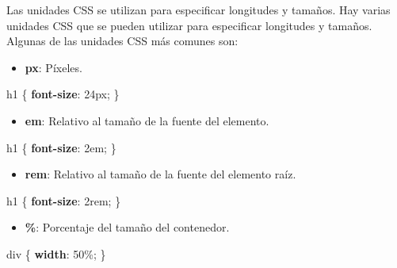 \documentclass[
  a4paper,
  DIV=11,
  numbers=noendperiod,
  onepage,
  openany]{scrreprt}
\newenvironment{Shaded}{\begin{snugshade}}{\end{snugshade}}
\newcommand{\CharTok}[1]{\textcolor[rgb]{0.13,0.47,0.30}{#1}}
\newcommand{\DataTypeTok}[1]{\textcolor[rgb]{0.68,0.00,0.00}{#1}}
\newcommand{\DecValTok}[1]{\textcolor[rgb]{0.68,0.00,0.00}{#1}}
\newcommand{\KeywordTok}[1]{\textcolor[rgb]{0.00,0.23,0.31}{\textbf{#1}}}
\newcommand{\NormalTok}[1]{\textcolor[rgb]{0.00,0.23,0.31}{#1}}
\newcommand{\OperatorTok}[1]{\textcolor[rgb]{0.37,0.37,0.37}{#1}}
\providecommand{\tightlist}{%
  \setlength{\itemsep}{0pt}\setlength{\parskip}{0pt}}\usepackage{longtable,booktabs,array}
\begin{document}
\begin{tcolorbox}
Las unidades CSS se utilizan para especificar longitudes y tamaños. Hay
varias unidades CSS que se pueden utilizar para especificar longitudes y
tamaños. Algunas de las unidades CSS más comunes son:

\begin{itemize}
\tightlist
\item
  \textbf{px}: Píxeles.
\end{itemize}

\begin{Shaded}
\begin{Highlighting}[]
\NormalTok{h1 \{}
  \KeywordTok{font{-}size}\CharTok{:} \DecValTok{24}\DataTypeTok{px}\OperatorTok{;}
\NormalTok{\}}
\end{Highlighting}
\end{Shaded}

\begin{itemize}
\tightlist
\item
  \textbf{em}: Relativo al tamaño de la fuente del elemento.
\end{itemize}

\begin{Shaded}
\begin{Highlighting}[]
\NormalTok{h1 \{}
  \KeywordTok{font{-}size}\CharTok{:} \DecValTok{2}\DataTypeTok{em}\OperatorTok{;}
\NormalTok{\}}
\end{Highlighting}
\end{Shaded}

\begin{itemize}
\tightlist
\item
  \textbf{rem}: Relativo al tamaño de la fuente del elemento raíz.
\end{itemize}

\begin{Shaded}
\begin{Highlighting}[]
\NormalTok{h1 \{}
  \KeywordTok{font{-}size}\CharTok{:} \DecValTok{2}\DataTypeTok{rem}\OperatorTok{;}
\NormalTok{\}}
\end{Highlighting}
\end{Shaded}

\begin{itemize}
\tightlist
\item
  \textbf{\%}: Porcentaje del tamaño del contenedor.
\end{itemize}

\begin{Shaded}
\begin{Highlighting}[]
\NormalTok{div \{}
  \KeywordTok{width}\CharTok{:} \DecValTok{50}\DataTypeTok{\%}\OperatorTok{;}
\NormalTok{\}}


\end{Highlighting}
\end{Shaded}
\end{tcolorbox}
\end{document}
